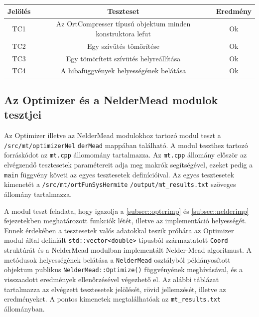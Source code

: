 \documentclass[oneside,titlepage,12pt,a4paper]{report}
\begin{document}
\begin{center}
\begin{adjustbox}{width=1\textwidth}
 \begin{tabular}{||c c c||} 
 \hline
 Jelölés & Teszteset & Eredmény\\ [0.5ex] 
 \hline\hline
 TC1 & Az OrtCompresser típusú objektum minden konstruktora lefut &  Ok \\ 
 \hline
 TC2 & Egy szívütés tömörítése &  Ok \\
 \hline
 TC3 & Egy tömörített szívütés helyreállítása & Ok \\
 \hline
 TC4 & A hibafüggvények helyességének belátása & Ok\\
 \hline
\end{tabular}
\end{adjustbox}
\end{center}

\subsection{Az Optimizer és a NelderMead modulok tesztjei}

Az Optimizer illetve az NelderMead modulokhoz tartozó modul teszt a \texttt{/src/mt/optimizerNel} \linebreak \texttt{derMead} mappában található. A modul teszthez tartozó forráskódot az \texttt{mt.cpp} állomomány tartalmazza. Az \texttt{mt.cpp} állomány először az elvégzendő tesztesetek paramétereit adja meg makrók segítségével, ezeket pedig a \texttt{main} függvény követi az egyes \linebreak  tesztesetek definícióival. Az egyes tesztesetek kimenetét a \texttt{/src/mt/ortFunSysHermite} \linebreak  \texttt{/output/mt\_results.txt} szöveges állomány tartalmazza. 
\par A modul teszt feladata, hogy igazolja a \ref{subsec::opterimp} és \ref{subsec::nelderimp} fejezetekben meghatározott funkciók létét, illetve az implementáció helyességét. Ennek érdekében a tesztesetek valós adatokkal teszik próbára az Optimizer modul által definiált \texttt{std::vector<double>} típusból származtatott \texttt{Coord} struktúrát és a NelderMead modulban implementált Nelder-Mead algoritmust. A metódusok helyességének belátása a \texttt{NelderMead} osztályból példányosított objektum publikus \texttt{NelderMead::Optimize()} függvényének meghívásával, és a visszaadott eredmények ellenőrzésével végezhető el. Az alábbi táblázat tartalmazza az elvégzett tesztesetek jelölését, rövid jellemzését, illetve az eredményeket. A pontos kimenetek megtalálhatóak az \texttt{mt\_results.txt} állományban. 
\end{document}
